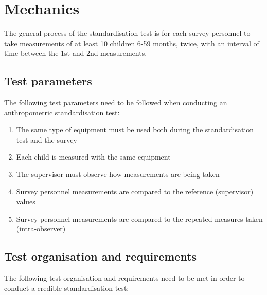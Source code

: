 \documentclass[
  12pt,
]{book}
\begin{document}
\hypertarget{mechanics}{%
\section{Mechanics}\label{mechanics}}

The general process of the standardisation test is for each survey personnel to take measurements of at least 10 children 6-59 months, twice, with an interval of time between the 1st and 2nd measurements.

\hypertarget{test-parameters}{%
\subsection{Test parameters}\label{test-parameters}}

The following test parameters need to be followed when conducting an anthropometric standardisation test:

\begin{enumerate}
\def\labelenumi{\arabic{enumi}.}
\item
  The same type of equipment must be used both during the standardisation test and the survey
\item
  Each child is measured with the same equipment
\item
  The supervisor must observe how measurements are being taken
\item
  Survey personnel measurements are compared to the reference (supervisor) values
\item
  Survey personnel measurements are compared to the repeated measures taken (intra-observer)
\end{enumerate}

\hypertarget{test-organisation-and-requirements}{%
\subsection{Test organisation and requirements}\label{test-organisation-and-requirements}}

The following test organisation and requirements need to be met in order to conduct a credible standardisation test:
\end{document}
